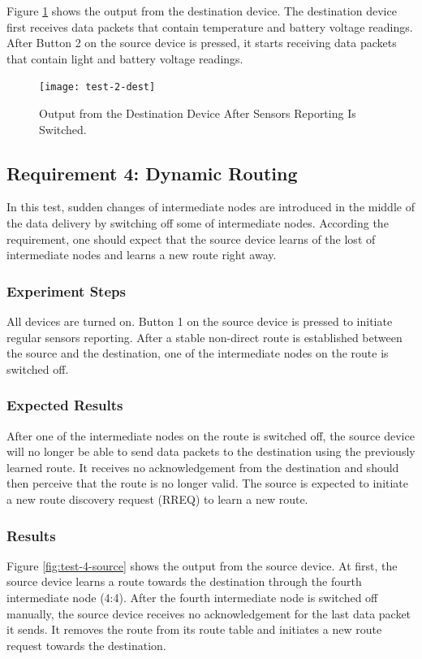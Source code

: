Figure \ref{fig:test-2-dest} shows the output from the destination device.
The destination device first receives data packets that contain temperature and battery voltage readings.
After Button 2 on the source device is pressed, it starts receiving data packets that contain light and battery voltage readings.

\begin{figure}
\centering
\texttt{[image: test-2-dest]}
\caption{Output from the Destination Device After Sensors Reporting Is Switched.}
\label{fig:test-2-dest}
\end{figure}

\subsection{Requirement 4: Dynamic Routing}

In this test, sudden changes of intermediate nodes are introduced in the middle of the data delivery by switching off some of intermediate nodes.
According the requirement, one should expect that the source device learns of the lost of intermediate nodes and learns a new route right away.

\subsubsection{Experiment Steps}
All devices are turned on.
Button 1 on the source device is pressed to initiate regular sensors reporting.
After a stable non-direct route is established between the source and the destination, one of the intermediate nodes on the route is switched off.

\subsubsection{Expected Results}
After one of the intermediate nodes on the route is switched off, the source device will no longer be able to send data packets to the destination using the previously learned route.
It receives no acknowledgement from the destination and should then perceive that the route is no longer valid.
The source is expected to initiate a new route discovery request (RREQ) to learn a new route.

\subsubsection{Results}

Figure \ref{fig:test-4-source} shows the output from the source device.
At first, the source device learns a route towards the destination through the fourth intermediate node (4:4).
After the fourth intermediate node is switched off manually, the source device receives no acknowledgement for the last data packet it sends.
It removes the route from its route table and initiates a new route request towards the destination.

